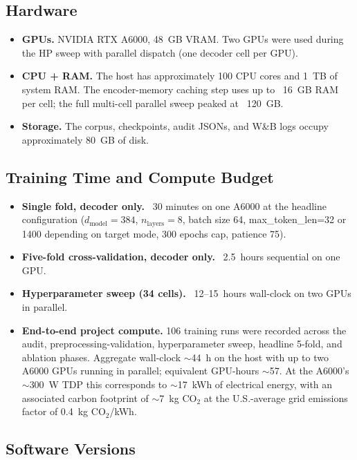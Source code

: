 \subsection{Hardware}
\label{app:repl-hardware}

\begin{itemize}
\item \textbf{GPUs.} NVIDIA RTX A6000, 48~GB VRAM. Two GPUs were used
during the HP sweep with parallel dispatch (one decoder cell per GPU).
\item \textbf{CPU + RAM.} The host has approximately 100 CPU cores and
1~TB of system RAM. The encoder-memory caching step uses up to ~16~GB
RAM per cell; the full multi-cell parallel sweep peaked at ~120~GB.
\item \textbf{Storage.} The corpus, checkpoints, audit JSONs, and W\&B
logs occupy approximately 80~GB of disk.
\end{itemize}

\subsection{Training Time and Compute Budget}
\label{app:repl-compute}

\begin{itemize}
\item \textbf{Single fold, decoder only.} ~30 minutes on one A6000
at the headline configuration ($d_{\text{model}}=384$, $n_{\text{layers}}=8$,
batch size 64, max\_token\_len=32 or 1400 depending on target mode,
300 epochs cap, patience 75).
\item \textbf{Five-fold cross-validation, decoder only.} ~2.5~hours
sequential on one GPU.
\item \textbf{Hyperparameter sweep (34 cells).} ~12--15~hours wall-clock
on two GPUs in parallel.
\item \textbf{End-to-end project compute.} 106 training runs were
recorded across the audit, preprocessing-validation, hyperparameter sweep,
headline 5-fold, and ablation phases. Aggregate wall-clock $\sim$44~h on
the host with up to two A6000 GPUs running in parallel; equivalent
GPU-hours $\sim$57. At the A6000's $\sim$300~W TDP this corresponds to
$\sim$17~kWh of electrical energy, with an associated carbon footprint of
$\sim$7~kg CO$_2$ at the U.S.-average grid emissions factor of 0.4~kg
CO$_2$/kWh.
\end{itemize}

\subsection{Software Versions}
\label{app:repl-software}

